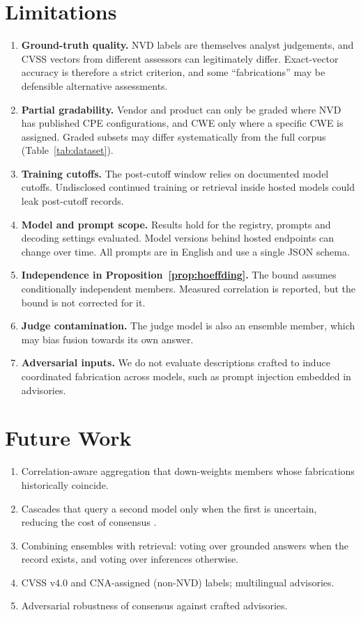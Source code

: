 \documentclass[11pt]{article}
\begin{document}
\section{Limitations}\label{sec:limitations}
\begin{enumerate}[leftmargin=1.6em]
\item \textbf{Ground-truth quality.} NVD labels are themselves analyst judgements, and CVSS vectors from different assessors can legitimately differ. Exact-vector accuracy is therefore a strict criterion, and some ``fabrications'' may be defensible alternative assessments.
\item \textbf{Partial gradability.} Vendor and product can only be graded where NVD has published CPE configurations, and CWE only where a specific CWE is assigned. Graded subsets may differ systematically from the full corpus (Table~\ref{tab:dataset}).
\item \textbf{Training cutoffs.} The post-cutoff window relies on documented model cutoffs. Undisclosed continued training or retrieval inside hosted models could leak post-cutoff records.
\item \textbf{Model and prompt scope.} Results hold for the registry, prompts and decoding settings evaluated. Model versions behind hosted endpoints can change over time. All prompts are in English and use a single JSON schema.
\item \textbf{Independence in Proposition~\ref{prop:hoeffding}.} The bound assumes conditionally independent members. Measured correlation is reported, but the bound is not corrected for it.
\item \textbf{Judge contamination.} The judge model is also an ensemble member, which may bias fusion towards its own answer.
\item \textbf{Adversarial inputs.} We do not evaluate descriptions crafted to induce coordinated fabrication across models, such as prompt injection embedded in advisories.
\end{enumerate}

\section{Future Work}\label{sec:future}
\begin{enumerate}[leftmargin=1.6em]
\item Correlation-aware aggregation that down-weights members whose fabrications historically coincide.
\item Cascades that query a second model only when the first is uncertain, reducing the cost of consensus \citep{chen2023frugalgpt}.
\item Combining ensembles with retrieval: voting over grounded answers when the record exists, and voting over inferences otherwise.
\item CVSS v4.0 and CNA-assigned (non-NVD) labels; multilingual advisories.
\item Adversarial robustness of consensus against crafted advisories.
\end{enumerate}
\end{document}
